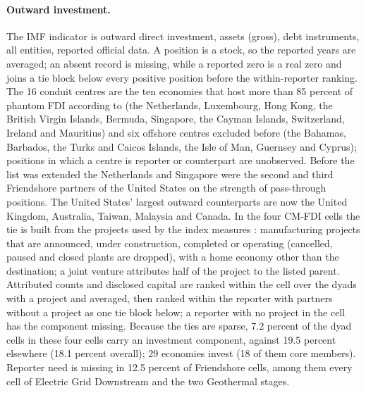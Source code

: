 \paragraph{Outward investment.} The IMF indicator is outward direct investment, assets (gross), debt
instruments, all entities, reported official data. A position is a stock, so the reported years are
averaged; an absent record is missing, while a reported zero is a real zero and joins a tie block
below every positive position before the within-reporter ranking. The 16 conduit centres are the
ten economies that host more than 85 percent of phantom FDI according to \citet{damgaard2024real}
(the Netherlands, Luxembourg, Hong Kong, the British Virgin Islands, Bermuda, Singapore, the Cayman
Islands, Switzerland, Ireland and Mauritius) and six offshore centres excluded before (the Bahamas,
Barbados, the Turks and Caicos Islands, the Isle of Man, Guernsey and Cyprus); positions in which a
centre is reporter or counterpart are unobserved. Before the list was extended the Netherlands and
Singapore were the second and third Friendshore partners of the United States on the strength of
pass-through positions. The United States' largest outward counterparts are now the United Kingdom,
Australia, Taiwan, Malaysia and Canada. In the four CM-FDI cells the tie is built from the projects
used by the index measures \citep{bandara2026cmfdi}: manufacturing projects that are announced,
under construction, completed or operating (cancelled, paused and closed plants are dropped), with a
home economy other than the destination; a joint venture attributes half of the project to the
listed parent. Attributed counts and disclosed capital are ranked within the cell over the dyads
with a project and averaged, then ranked within the reporter with partners without a project as one
tie block below; a reporter with no project in the cell has the component missing. Because the ties
are sparse, 7.2 percent of the dyad cells in these four cells carry an investment component, against
19.5 percent elsewhere (18.1 percent overall); 29 economies invest (18 of them core members). Reporter
need is missing in 12.5 percent of Friendshore cells, among them every cell of Electric Grid
Downstream and the two Geothermal stages.

